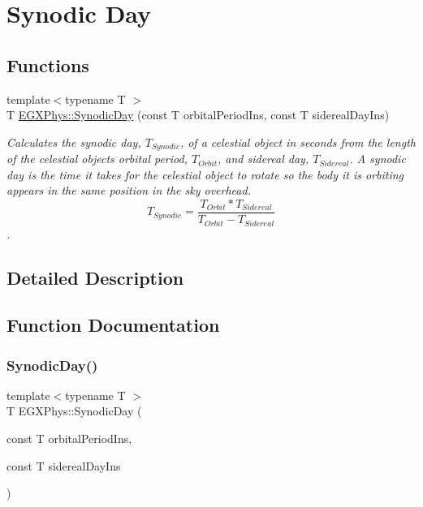 \hypertarget{group___e_g_x_phys-_astrophysic-_synodic_day}{}\section{Synodic Day}
\label{group___e_g_x_phys-_astrophysic-_synodic_day}
\subsection*{Functions}
\begin{DoxyCompactItemize}
\item 
{\footnotesize template$<$typename T $>$ }\\T \mbox{\hyperlink{group___e_g_x_phys-_astrophysic-_synodic_day_ga637140842bc008c87d90e65b551cbac7}{E\+G\+X\+Phys\+::\+Synodic\+Day}} (const T orbital\+Period\+Ins, const T sidereal\+Day\+Ins)
\begin{DoxyCompactList}\small\item\em Calculates the synodic day, $T_{Synodic}$, of a celestial object in seconds from the length of the celestial object\textquotesingle{}s orbital period, $T_{Orbit}$, and sidereal day, $T_{Sidereal}$. A synodic day is the time it takes for the celestial object to rotate so the body it is orbiting appears in the same position in the sky overhead. \[ T_{Synodic}=\dfrac{T_{Orbit} * T_{Sidereal}}{T_{Orbit} - T_{Sidereal}}\]. \end{DoxyCompactList}\end{DoxyCompactItemize}


\subsection{Detailed Description}


\subsection{Function Documentation}
\mbox{\label{group___e_g_x_phys-_astrophysic-_synodic_day_ga637140842bc008c87d90e65b551cbac7}} 
\subsubsection{\texorpdfstring{Synodic\+Day()}{SynodicDay()}}
{\footnotesize\ttfamily template$<$typename T $>$ \\
T E\+G\+X\+Phys\+::\+Synodic\+Day (\begin{DoxyParamCaption}\item[{const T}]{orbital\+Period\+Ins,  }\item[{const T}]{sidereal\+Day\+Ins }\end{DoxyParamCaption})}



